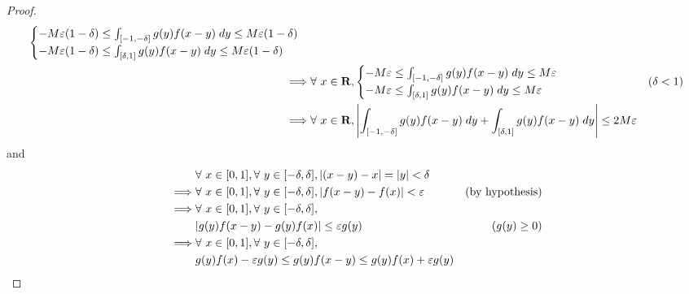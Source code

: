 \begin{proof}
\begin{align*}
\begin{cases}
            -M \varepsilon (1 - \delta) \leq \int_{[-1, -\delta]} g(y) f(x - y) \; dy \leq M \varepsilon (1 - \delta) \\
            -M \varepsilon (1 - \delta) \leq \int_{[\delta, 1]} g(y) f(x - y) \; dy \leq M \varepsilon (1 - \delta)
        \end{cases}                                                                                                   \\
        \implies & \forall\ x \in \mathbf{R}, \begin{cases}
            -M \varepsilon \leq \int_{[-1, -\delta]} g(y) f(x - y) \; dy \leq M \varepsilon \\
            -M \varepsilon \leq \int_{[\delta, 1]} g(y) f(x - y) \; dy \leq M \varepsilon
        \end{cases}                                                                                    & (\delta < 1) \\
        \implies & \forall\ x \in \mathbf{R}, \abs*{\int_{[-1, -\delta]} g(y) f(x - y) \; dy + \int_{[\delta, 1]} g(y) f(x - y) \; dy} \leq 2 M \varepsilon
    \end{align*}
    and
    \begin{align*}
                 & \forall\ x \in [0, 1], \forall\ y \in [-\delta, \delta], \abs*{(x - y) - x} = \abs*{y} < \delta                                                                     \\
        \implies & \forall\ x \in [0, 1], \forall\ y \in [-\delta, \delta], \abs*{f(x - y) - f(x)} < \varepsilon                                 & \text{(by hypothesis)}              \\
        \implies & \forall\ x \in [0, 1], \forall\ y \in [-\delta, \delta],                                                                                                            \\
                 & \abs*{g(y) f(x - y) - g(y) f(x)} \leq \varepsilon g(y)                                                                        & (g(y) \geq 0)                       \\
        \implies & \forall\ x \in [0, 1], \forall\ y \in [-\delta, \delta],                                                                                                            \\
                 & g(y) f(x) - \varepsilon g(y) \leq g(y) f(x - y) \leq g(y) f(x) + \varepsilon g(y)                                                                                   \\

\end{align*}
\end{proof}
